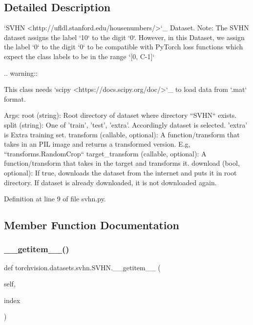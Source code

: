 \subsection{Detailed Description}
\begin{DoxyVerb}`SVHN <http://ufldl.stanford.edu/housenumbers/>`_ Dataset.
Note: The SVHN dataset assigns the label `10` to the digit `0`. However, in this Dataset,
we assign the label `0` to the digit `0` to be compatible with PyTorch loss functions which
expect the class labels to be in the range `[0, C-1]`

.. warning::

    This class needs `scipy <https://docs.scipy.org/doc/>`_ to load data from `.mat` format.

Args:
    root (string): Root directory of dataset where directory
        ``SVHN`` exists.
    split (string): One of {'train', 'test', 'extra'}.
        Accordingly dataset is selected. 'extra' is Extra training set.
    transform (callable, optional): A function/transform that  takes in an PIL image
        and returns a transformed version. E.g, ``transforms.RandomCrop``
    target_transform (callable, optional): A function/transform that takes in the
        target and transforms it.
    download (bool, optional): If true, downloads the dataset from the internet and
        puts it in root directory. If dataset is already downloaded, it is not
        downloaded again.\end{DoxyVerb}
 

Definition at line 9 of file svhn.\+py.



\subsection{Member Function Documentation}
\mbox{\label{classtorchvision_1_1datasets_1_1svhn_1_1SVHN_a3ac11d917119a91a16c9a5f265e8f2a1}} 
\subsubsection{\texorpdfstring{\+\_\+\+\_\+getitem\+\_\+\+\_\+()}{\_\_getitem\_\_()}}
{\footnotesize\ttfamily def torchvision.\+datasets.\+svhn.\+S\+V\+H\+N.\+\_\+\+\_\+getitem\+\_\+\+\_\+ (\begin{DoxyParamCaption}\item[{}]{self,  }\item[{}]{index }\end{DoxyParamCaption})}

